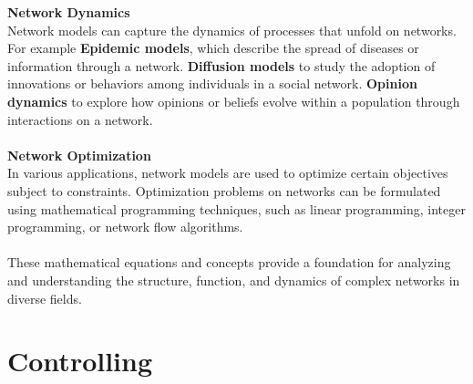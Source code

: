 \documentclass[12pt]{report}
\begin{document}
\noindent \textbf{Network Dynamics}\\
Network models can capture the dynamics of processes that unfold on networks. For example 
\textbf{Epidemic models}, which describe the spread of diseases or information
through a network. \textbf{Diffusion models} to study the adoption of innovations or behaviors
among individuals in a social network. \textbf{Opinion dynamics} to explore how opinions or
beliefs evolve within a population through interactions on a network.\\
\\
\textbf{Network Optimization}\\
In various applications, network models are used to optimize certain objectives subject to
constraints. Optimization problems on networks can be formulated using mathematical
programming techniques, such as linear programming, integer programming, or network
flow algorithms.\\
\\
These mathematical equations and concepts provide a foundation for analyzing and understanding
the structure, function, and dynamics of complex networks in diverse fields.

\chapter{Controlling}
\end{document}
